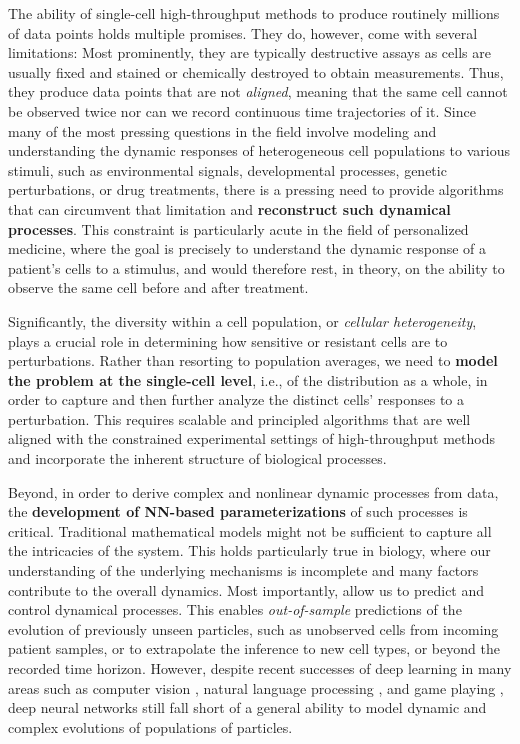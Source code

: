 The ability of single-cell high-throughput methods to produce routinely millions of data points holds multiple promises. They do, however, come with several limitations: 
 Most prominently, they are typically destructive assays as cells are usually fixed and stained or chemically destroyed to obtain measurements. Thus, they produce data points that are not \textit{aligned}, meaning that the same cell cannot be observed twice nor can we record continuous time trajectories of it.
Since many of the most pressing questions in the field involve modeling and understanding the dynamic responses of heterogeneous cell populations to various stimuli, such as environmental signals, developmental processes, genetic perturbations, or drug treatments, there is a pressing need to provide algorithms that can circumvent that limitation and \textbf{reconstruct such dynamical processes}. 
This constraint is particularly acute in the field of personalized medicine, where the goal is precisely to understand the dynamic response of a patient's cells to a stimulus, and would therefore rest, in theory, on the ability to observe the same cell before and after treatment.

Significantly, the diversity within a cell population, or \textit{cellular heterogeneity}, plays a crucial role in determining how sensitive or resistant cells are to perturbations.
Rather than resorting to population averages, we need to \textbf{model the problem at the single-cell level}, i.e., of the distribution as a whole, in order to capture and then further analyze the distinct cells' responses to a perturbation. 
This requires scalable and principled algorithms that are well aligned with the constrained experimental settings of high-throughput methods and incorporate the inherent structure of biological processes.

Beyond, in order to derive complex and nonlinear dynamic processes from data, the \textbf{development of \acrlong{NN}-based parameterizations} of such processes is critical.
Traditional mathematical models might not be sufficient to capture all the intricacies of the system. This holds particularly true  in biology, where our understanding of the underlying mechanisms is incomplete and many factors contribute to the overall dynamics.
Most importantly,  allow us to predict and control dynamical processes. This enables \emph{out-of-sample} predictions of the evolution of previously unseen particles, such as unobserved cells from incoming patient samples, or to extrapolate the inference to new cell types, or beyond the recorded time horizon.
However, despite recent successes of deep learning in many areas such as computer vision \citep{lecun1998gradient, krizhevsky2012imagenet}, natural language processing \citep{bengio2000neural, vaswani2017attention}, and game playing \citep{mnih2015human, silver2016mastering}, deep neural networks still fall short of a general ability to model dynamic and complex evolutions of populations of particles. \\

